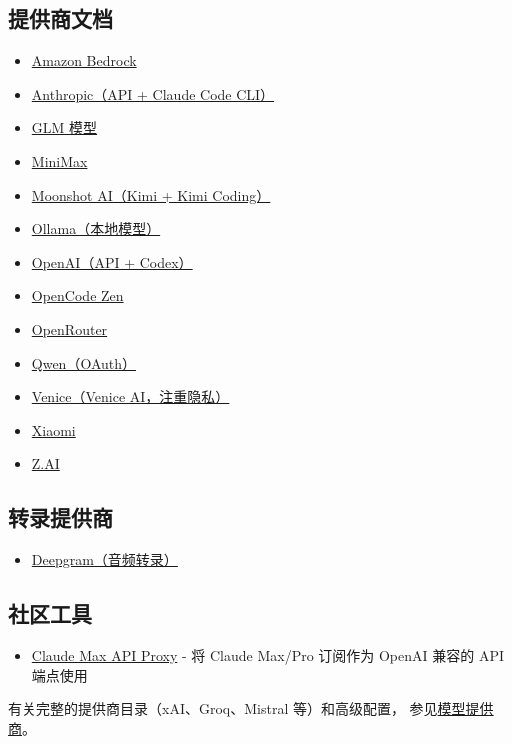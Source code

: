\subsection{提供商文档}


\begin{itemize}
  \item \href{/providers/bedrock}{Amazon Bedrock}
  \item \href{/providers/anthropic}{Anthropic（API + Claude Code CLI）}
  \item \href{/providers/glm}{GLM 模型}
  \item \href{/providers/minimax}{MiniMax}
  \item \href{/providers/moonshot}{Moonshot AI（Kimi + Kimi Coding）}
  \item \href{/providers/ollama}{Ollama（本地模型）}
  \item \href{/providers/openai}{OpenAI（API + Codex）}
  \item \href{/providers/opencode}{OpenCode Zen}
  \item \href{/providers/openrouter}{OpenRouter}
  \item \href{/providers/qwen}{Qwen（OAuth）}
  \item \href{/providers/venice}{Venice（Venice AI，注重隐私）}
  \item \href{/providers/xiaomi}{Xiaomi}
  \item \href{/providers/zai}{Z.AI}
\end{itemize}


\subsection{转录提供商}


\begin{itemize}
  \item \href{/providers/deepgram}{Deepgram（音频转录）}
\end{itemize}


\subsection{社区工具}


\begin{itemize}
  \item \href{/providers/claude-max-api-proxy}{Claude Max API Proxy} - 将 Claude Max/Pro 订阅作为 OpenAI 兼容的 API 端点使用
\end{itemize}


有关完整的提供商目录（xAI、Groq、Mistral 等）和高级配置，
参见\href{/concepts/model-providers}{模型提供商}。


